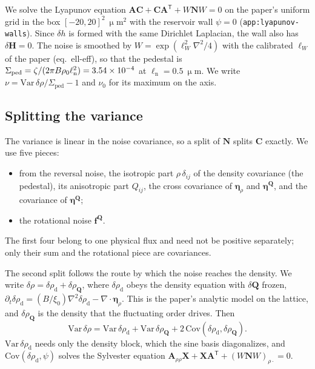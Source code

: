 \documentclass[11pt,a4paper]{article}
\newcommand{\Q}{\mathbf{Q}}
\renewcommand{\H}{\mathbf{H}}
\newcommand{\micron}{\upmu\mathrm{m}}
\begin{document}
We solve the Lyapunov equation $\mathbf A\mathbf C+\mathbf C\mathbf A^{\mathsf T}+W\mathbf N W=0$
on the paper's uniform grid in the box $[-20,20]^2~\micron^2$ with the reservoir wall $\psi=0$
(\texttt{app:lyapunov-walls}). Since $\delta h$ is formed with the same Dirichlet Laplacian,
the wall also has $\delta\H=0$. The noise is smoothed by $W=\exp(\ell_W^2\nabla^2/4)$ with the
calibrated $\ell_W$ of the paper (eq.~ell-eff), so that the pedestal is
$\Sigma_\mathrm{ped}=\zeta/(2\pi B\rho_0\ell_\mathrm n^2)=3.54\times10^{-4}$ at $\ell_\mathrm n=0.5~\micron$.
We write $\nu=\mathrm{Var}\,\delta\rho/\Sigma_\mathrm{ped}-1$ and $\nu_0$ for its maximum on the
axis.

\subsection{Splitting the variance}
The variance is linear in the noise covariance, so a split of $\mathbf N$ splits $\mathbf C$
exactly. We use five pieces:
\begin{itemize}
  \item from the reversal noise, the isotropic part $\rho\,\delta_{ij}$ of the density
    covariance (the pedestal), its anisotropic part $Q_{ij}$, the cross covariance of
    $\bm\eta_\rho$ and $\bm\eta^{\Q}$, and the covariance of $\bm\eta^{\Q}$;
  \item the rotational noise $\mathbf f^{\Q}$.
\end{itemize}
The first four belong to one physical flux and need not be positive separately; only their
sum and the rotational piece are covariances.

The second split follows the route by which the noise reaches the density. We write
$\delta\rho=\delta\rho_\mathrm d+\delta\rho_{\Q}$, where $\delta\rho_\mathrm d$ obeys the density
equation with $\delta\Q$ frozen, $\partial_t\delta\rho_\mathrm d=(B/\xi_0)\nabla^2\delta\rho_\mathrm d
-\nabla\!\cdot\!\bm\eta_\rho$. This is the paper's analytic model on the lattice, and
$\delta\rho_{\Q}$ is the density that the fluctuating order drives. Then
\begin{equation}
  \mathrm{Var}\,\delta\rho=\mathrm{Var}\,\delta\rho_\mathrm d+\mathrm{Var}\,\delta\rho_{\Q}
  +2\,\mathrm{Cov}(\delta\rho_\mathrm d,\delta\rho_{\Q}).
\end{equation}
$\mathrm{Var}\,\delta\rho_\mathrm d$ needs only the density block, which the sine basis
diagonalizes, and $\mathrm{Cov}(\delta\rho_\mathrm d,\psi)$ solves the Sylvester equation
$\mathbf A_{\rho\rho}\mathbf X+\mathbf X\mathbf A^{\mathsf T}+(W\mathbf NW)_{\rho\cdot}=0$.
\end{document}
